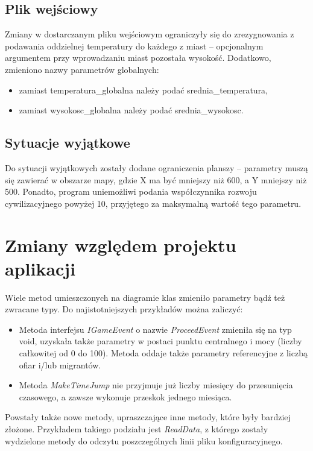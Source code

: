 \documentclass[a4paper,12pt]{article}
\newcommand\tab[1][0.6cm]{\hspace*{#1} }
\begin{document}
\subsection{Plik wejściowy}

\tab Zmiany w dostarczanym pliku wejściowym ograniczyły się do zrezygnowania z podawania oddzielnej temperatury do każdego z miast -- opcjonalnym argumentem przy wprowadzaniu miast pozostała wysokość. Dodatkowo, zmieniono nazwy parametrów globalnych: 
\begin{itemize}
\item zamiast temperatura\_globalna należy podać srednia\_temperatura,
\item zamiast wysokosc\_globalna należy podać srednia\_wysokosc.
\end{itemize}

\subsection{Sytuacje wyjątkowe}

\tab Do sytuacji wyjątkowych zostały dodane ograniczenia planszy -- parametry muszą się zawierać w obszarze mapy, gdzie X ma być mniejszy niż 600, a Y mniejszy niż 500. Ponadto, program uniemożliwi podania współczynnika rozwoju cywilizacyjnego powyżej 10, przyjętego za maksymalną wartość tego parametru.

\section{Zmiany względem projektu aplikacji}

\tab Wiele metod umieszczonych na diagramie klas zmieniło parametry bądź też zwracane typy. Do najistotniejszych przykładów można zaliczyć:

\begin{itemize}
\item Metoda interfejsu \textit{IGameEvent} o nazwie \textit{ProceedEvent} zmieniła się na typ void, uzyskała także parametry w postaci punktu centralnego i mocy (liczby całkowitej od 0 do 100). Metoda oddaje także parametry referencyjne z liczbą ofiar i/lub migrantów.
\item Metoda \textit{MakeTimeJump} nie przyjmuje już liczby miesięcy do przesunięcia czasowego, a zawsze wykonuje przeskok jednego miesiąca.
\end{itemize}

\tab Powstały także nowe metody, upraszczające inne metody, które były bardziej złożone. Przykładem takiego podziału jest \textit{ReadData}, z którego zostały wydzielone metody do odczytu poszczególnych linii pliku konfiguracyjnego.
\end{document}
